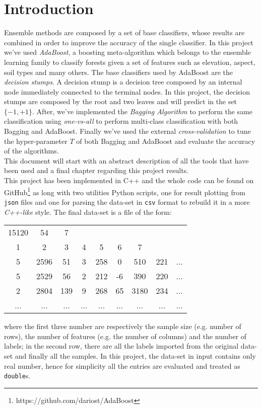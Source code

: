 \chapter{Introduction}
Ensemble methods are composed by a set of base classifiers, whose results are combined in order to improve the accuracy of the single classifier. In this project we've used \textit{AdaBoost}, a boosting meta-algorithm which belongs to the ensemble learning family to classify forests given a set of features such as elevation, aspect, soil types and many others. The base classifiers used by AdaBoost are the \textit{decision stumps}. A decision stump is a decision tree composed by an internal node immediately connected to the terminal nodes. In this project, the decision stumps are composed by the root and two leaves and will predict in the set $\lbrace-1, +1\rbrace$. After, we've implemented the \textit{Bagging Algorithm} to perform the same classification using \textit{one-vs-all} to perform multi-class classification with both Bagging and AdaBoost. Finally we've used the external \textit{cross-validation} to tune the hyper-parameter $T$ of both Bagging and AdaBoost and evaluate the accuracy of the algorithms. \\
This document will start with an abstract description of all the tools that have been used and a final chapter regarding this project results.\\
This project has been implemented in C++ and the whole code can be found on GitHub\footnote{https://github.com/dariost/AdaBoost} as long with two utilities Python scripts, one for result plotting from \texttt{json} files and one for parsing the data-set in \texttt{csv} format to rebuild it in a more \textit{C++-like} style. The final data-set is a file of the form:
\begin{center}
\begin{tabular}{ccccccccc}
	15120 & 54 & 7 &  &  &  &  &  &  \\ 
	1 & 2 & 3 & 4 & 5 & 6 & 7 &  &  \\ 
	5 & 2596 & 51 & 3 & 258 & 0 & 510 & 221 & ... \\
	5 & 2529 & 56 & 2 & 212 & -6 & 390 & 220 & ... \\
	2 & 2804 & 139 & 9 & 268 & 65 & 3180 & 234 & ... \\
	... & ... & ... & ... & ... & ... & ... & ... & ... \\
\end{tabular}
\end{center} 
where the first three number are respectively the sample size (e.g. number of rows), the number of features (e.g. the number of columns) and the number of labels; in the second row, there are all the labels imported from the original data-set and finally all the samples. In this project, the data-set in input contains only real number, hence for simplicity all the entries are evaluated and treated as \texttt{double}s.\\
